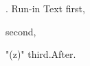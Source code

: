 
\document
{}. Run-in\endhead
Text \roster\runinitem first, \item second, \item"(z)" third.\endroster After.
\enddocument
